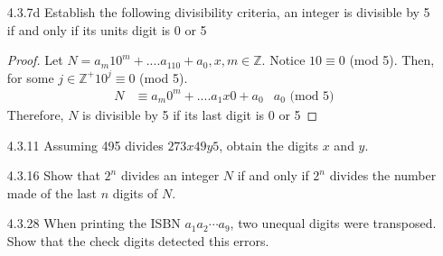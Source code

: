 \documentclass[12pt]{article}
\newcommand{\Z}{\mathds{Z}}
\begin{document}
\begin{enumerate}
	\item[4.3.7d] Establish the following divisibility criteria, an integer is divisible by 5 if and only if its units digit is 0 or 5
		  \begin{proof}
		  	Let $ N = a_m10^m+....a_110+a_0 , x,m\in\Z$. Notice $ 10 \equiv 0 $ (mod 5). Then, for some $ j\in\Z^+ 10^j  \equiv 0$ (mod 5). 
		  	\begin{align*}
		  		N& \equiv a_m0^m+....a_1x0+a_0 
		  		 & a_0 \text{ (mod 5)}
		  	\end{align*}
		  	Therefore, $ N $ is divisible by 5 if its last digit is 0 or 5
		  \end{proof}
	\item[4.3.11] Assuming 495 divides $273x49y5$, obtain the digits $ x $ and $ y $.
	
	\item[4.3.16] Show that $ 2^n $ divides an integer $ N $ if and only if $ 2^n $ divides the number made of the last $ n $ digits of $ N $.
	
	\item[4.3.28] When printing the ISBN $ a_1a_2\cdots a_9 $, two unequal digits were transposed. Show that the check digits detected this errors.
	
\end{enumerate}
\end{document}
